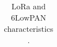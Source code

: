 \begin{table}
\begin{tabular}{l|l|l|l}
\end{tabular}
\caption{LoRa and 6LowPAN characteristics \cite{al-kashoash_comparison_2016}.}
\end{table}


\cite{raza_low_22}
\cite{lopes_design_2019}


